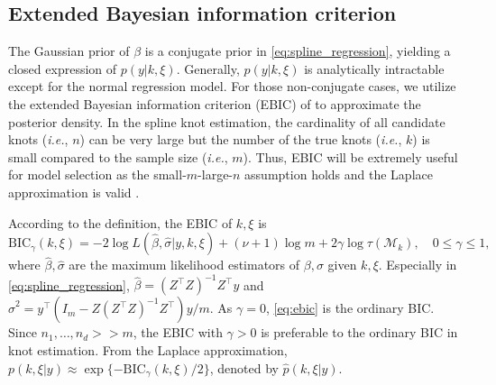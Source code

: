 \subsection{Extended Bayesian information criterion}

The Gaussian prior of $\beta$ is a conjugate prior in \eqref{eq:spline_regression}, yielding a closed expression of $p(y|k,\xi)$. Generally, $p(y|k,\xi)$ is analytically intractable except for the normal regression model. %
For those non-conjugate cases, we utilize the extended Bayesian information criterion (EBIC) of \citet{10.1093/biomet/asn034} to approximate the posterior density. %
In the spline knot estimation, the cardinality of all candidate knots (\emph{i.e.}, $n$) can be very large but the number of the true knots (\emph{i.e.}, $k$) is small compared to the sample size (\emph{i.e.}, $m$). Thus, EBIC will be extremely useful for model selection as the small-$m$-large-$n$ assumption holds and the Laplace approximation is valid \citep{NIPS2010_072b030b, bb6df906-631b-39ae-98e5-1c3a3cd1049c, Luo2015}.

According to the definition, the EBIC of $k,\xi$ is
\begin{equation}
    \label{eq:ebic}
    \text{BIC}_{\gamma}(k,\xi) = -2\log L(\hat{\beta},\hat{\sigma}|y,k,\xi) + (\nu+1) \log m + 2\gamma \log \tau(\mathcal{M}_k),\quad 0\leq \gamma \leq 1,
\end{equation}
where $\hat{\beta},\hat{\sigma}$ are the maximum likelihood estimators of $\beta,\sigma$ given $k,\xi$. Especially in \eqref{eq:spline_regression}, $\hat{\beta}=(Z^\top Z)^{-1}Z^\top y$ and $\hat{\sigma}^2 = y^\top (I_m-Z(Z^\top Z)^{-1}Z^\top)y/m$. %
As $\gamma=0$, \eqref{eq:ebic} is the ordinary BIC. Since $n_1,\ldots,n_d>>m$, the EBIC with $\gamma>0$ is preferable to the ordinary BIC in knot estimation. From the Laplace approximation, $p(k,\xi|y)\approx \exp\{-\text{BIC}_\gamma(k,\xi)/2\}$, denoted by $\hat{p}(k,\xi|y)$.

